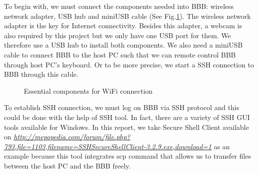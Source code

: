 \documentclass[12pt,journal,draftclsnofoot,onecolumn]{IEEEtran}
\begin{document}
To begin with, we must connect the components needed into BBB: wireless network adapter, USB hub and miniUSB cable (See Fig.\ref{WiFi}). The wireless network adapter is the key for Internet connectivity. Besides this adapter, a webcam is also required by this project but we only have one USB port for them.  We therefore use a USB hub to install both components. We also need a miniUSB cable to connect BBB to the host PC such that we can remote control BBB through host PC's keyboard. Or to be more precise, we start a SSH connection to BBB through this cable.

\begin{figure}[htb]
	\centering
     \caption{Essential components for WiFi connection}
     \label{WiFi}
     \end{figure}


To establish SSH connection, we must log on BBB via SSH protocol and this could be done with the help of SSH tool. In fact, there are a variety of SSH GUI tools available for Windows. In this report, we take Secure Shell Client available on \textcolor{blue}{\textit{\url{http://mepopedia.com/forum/file.php?793,file=1103,filename=SSHSecureShellClient-3.2.9.exe,download=1}}}  as an example because this tool integrates scp command that allows us to transfer files between the host PC and the BBB freely.
\end{document}
